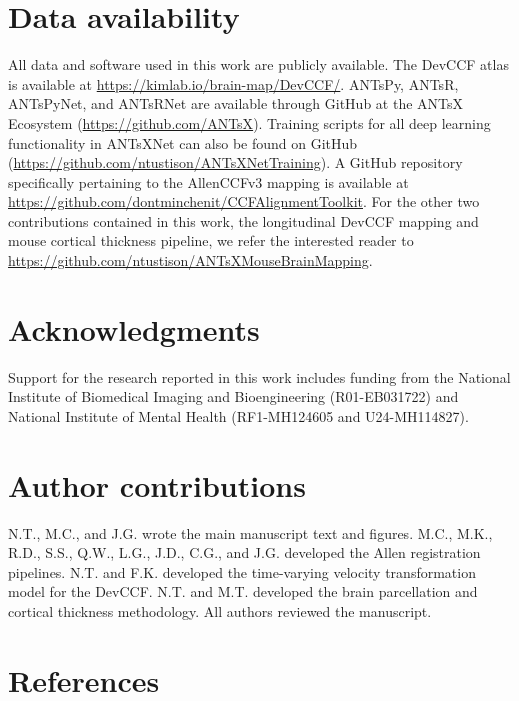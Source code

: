 \documentclass[
  12pt,
]{article}
\begin{document}
\clearpage

\section*{Data availability}\label{data-availability}

All data and software used in this work are publicly available. The
DevCCF atlas is available at \url{https://kimlab.io/brain-map/DevCCF/}.
ANTsPy, ANTsR, ANTsPyNet, and ANTsRNet are available through GitHub at
the ANTsX Ecosystem (\url{https://github.com/ANTsX}). Training scripts
for all deep learning functionality in ANTsXNet can also be found on
GitHub (\url{https://github.com/ntustison/ANTsXNetTraining}). A GitHub
repository specifically pertaining to the AllenCCFv3 mapping is
available at \url{https://github.com/dontminchenit/CCFAlignmentToolkit}.
For the other two contributions contained in this work, the longitudinal
DevCCF mapping and mouse cortical thickness pipeline, we refer the
interested reader to
\url{https://github.com/ntustison/ANTsXMouseBrainMapping}.

\clearpage

\section*{Acknowledgments}\label{acknowledgments}

Support for the research reported in this work includes funding from the
National Institute of Biomedical Imaging and Bioengineering
(R01-EB031722) and National Institute of Mental Health (RF1-MH124605 and
U24-MH114827).

\clearpage

\section*{Author contributions}\label{author-contributions}

N.T., M.C., and J.G. wrote the main manuscript text and figures. M.C.,
M.K., R.D., S.S., Q.W., L.G., J.D., C.G., and J.G. developed the Allen
registration pipelines. N.T. and F.K. developed the time-varying
velocity transformation model for the DevCCF. N.T. and M.T. developed
the brain parcellation and cortical thickness methodology. All authors
reviewed the manuscript. \clearpage

\section*{References}\label{references}
\end{document}
